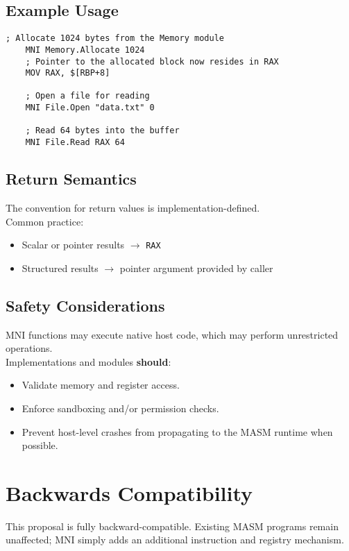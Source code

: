 \documentclass[11pt]{article}
\begin{document}
	\subsection{Example Usage}
	\begin{lstlisting}[language=MicroASM]
	; Allocate 1024 bytes from the Memory module
	MNI Memory.Allocate 1024
	; Pointer to the allocated block now resides in RAX
	MOV RAX, $[RBP+8]

	; Open a file for reading
	MNI File.Open "data.txt" 0

	; Read 64 bytes into the buffer
	MNI File.Read RAX 64
	\end{lstlisting}

	\subsection{Return Semantics}
	The convention for return values is implementation-defined.\\
	Common practice:
	\begin{itemize}
		\item Scalar or pointer results $\rightarrow$ \texttt{RAX}
		\item Structured results $\rightarrow$ pointer argument provided by caller
	\end{itemize}

	\subsection{Safety Considerations}
	MNI functions may execute native host code, which may perform unrestricted operations.\\
	Implementations and modules \textbf{should}:
	\begin{itemize}
		\item Validate memory and register access.
		\item Enforce sandboxing and/or permission checks.
		\item Prevent host-level crashes from propagating to the MASM runtime when possible.
	\end{itemize}
	
	\section{Backwards Compatibility}
	This proposal is fully backward-compatible.  
	Existing MASM programs remain unaffected; MNI simply adds an additional instruction and registry mechanism.
	
\end{document}
